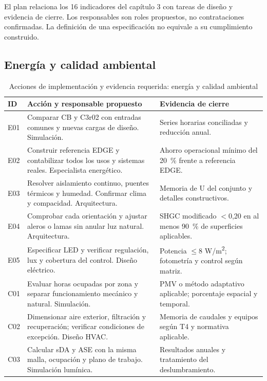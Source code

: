 El plan relaciona los 16 indicadores del capítulo 3 con tareas de diseño y evidencia de cierre. Los responsables son roles propuestos, no contrataciones confirmadas. La definición de una especificación no equivale a su cumplimiento construido.
\par\medskip
\subsection{Energía y calidad ambiental}
\begin{table}[H]\centering
\caption{Acciones de implementación y evidencia requerida: energía y calidad ambiental}
{\fontsize{9}{11}\selectfont\singlespacing\renewcommand{\arraystretch}{1.3}
\begin{tabular}{>{\raggedright\arraybackslash}p{1.1cm}>{\raggedright\arraybackslash}p{6.1cm}>{\raggedright\arraybackslash}p{6.1cm}}\toprule
ID & Acción y responsable propuesto & Evidencia de cierre \\ \midrule
E01 & Comparar CB y C3r02 con entradas comunes y nuevas cargas de diseño. Simulación. & Series horarias conciliadas y reducción anual. \\
E02 & Construir referencia EDGE y contabilizar todos los usos y sistemas reales. Especialista energético. & Ahorro operacional mínimo del 20 \,\% frente a referencia EDGE. \\
E03 & Resolver aislamiento continuo, puentes térmicos y humedad. Confirmar clima y compacidad. Arquitectura. & Memoria de U del conjunto y detalles constructivos. \\
E04 & Comprobar cada orientación y ajustar aleros o lamas sin anular luz natural. Arquitectura. & SHGC modificado $<$0,20 en al menos 90 \,\% de superficies aplicables. \\
E05 & Especificar LED y verificar regulación, lux y cobertura del control. Diseño eléctrico. & Potencia $\leq$8 W/m\textsuperscript{2}; fotometría y control según matriz. \\
C01 & Evaluar horas ocupadas por zona y separar funcionamiento mecánico y natural. Simulación. & PMV o método adaptativo aplicable; porcentaje espacial y temporal. \\
C02 & Dimensionar aire exterior, filtración y recuperación; verificar condiciones de excepción. Diseño HVAC. & Memoria de caudales y equipos según T4 y normativa aplicable. \\
C03 & Calcular sDA y ASE con la misma malla, ocupación y plano de trabajo. Simulación lumínica. & Resultados anuales y tratamiento del deslumbramiento. \\
\bottomrule\end{tabular}}
\end{table}
\par\medskip
